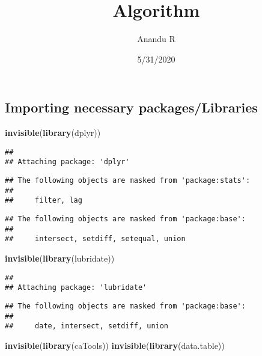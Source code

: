 \documentclass[
]{article}
\title{Algorithm}
\author{Anandu R}
\date{5/31/2020}
\newenvironment{Shaded}{\begin{snugshade}}{\end{snugshade}}
\newcommand{\KeywordTok}[1]{\textcolor[rgb]{0.13,0.29,0.53}{\textbf{#1}}}
\newcommand{\NormalTok}[1]{#1}
\begin{document}
\maketitle

\hypertarget{importing-necessary-packageslibraries}{%
\subsection{Importing necessary
packages/Libraries}\label{importing-necessary-packageslibraries}}

\begin{Shaded}
\begin{Highlighting}[]
\KeywordTok{invisible}\NormalTok{(}\KeywordTok{library}\NormalTok{(dplyr))}
\end{Highlighting}
\end{Shaded}

\begin{verbatim}
## 
## Attaching package: 'dplyr'
\end{verbatim}

\begin{verbatim}
## The following objects are masked from 'package:stats':
## 
##     filter, lag
\end{verbatim}

\begin{verbatim}
## The following objects are masked from 'package:base':
## 
##     intersect, setdiff, setequal, union
\end{verbatim}

\begin{Shaded}
\begin{Highlighting}[]
\KeywordTok{invisible}\NormalTok{(}\KeywordTok{library}\NormalTok{(lubridate))}
\end{Highlighting}
\end{Shaded}

\begin{verbatim}
## 
## Attaching package: 'lubridate'
\end{verbatim}

\begin{verbatim}
## The following objects are masked from 'package:base':
## 
##     date, intersect, setdiff, union
\end{verbatim}

\begin{Shaded}
\begin{Highlighting}[]
\KeywordTok{invisible}\NormalTok{(}\KeywordTok{library}\NormalTok{(caTools))}
\KeywordTok{invisible}\NormalTok{(}\KeywordTok{library}\NormalTok{(data.table))}
\end{Highlighting}
\end{Shaded}
\end{document}
